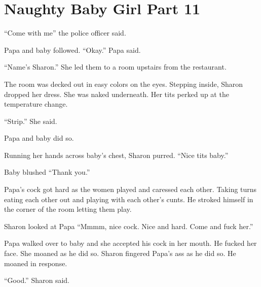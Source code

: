 \section{Naughty Baby Girl Part 11}

    “Come with me” the police officer said.

    Papa and baby followed. “Okay.” Papa said.

    “Name’s Sharon.” She led them to a room upstairs from the restaurant.

    The room was decked out in easy colors on the eyes. Stepping inside, Sharon dropped her dress. She was naked underneath. Her tits perked up at the temperature change.

    “Strip.” She said.

    Papa and baby did so.

    Running her hands across baby’s chest, Sharon purred. “Nice tits baby.”

    Baby blushed “Thank you.”

    Papa’s cock got hard as the women played and caressed each other. Taking turns eating each other out and playing with each other’s cunts. He stroked himself in the corner of the room letting them play.

    Sharon looked at Papa “Mmmm, nice cock. Nice and hard. Come and fuck her.”

    Papa walked over to baby and she accepted his cock in her mouth. He fucked her face. She moaned as he did so. Sharon fingered Papa’s ass as he did so. He moaned in response.

    “Good.” Sharon said.

